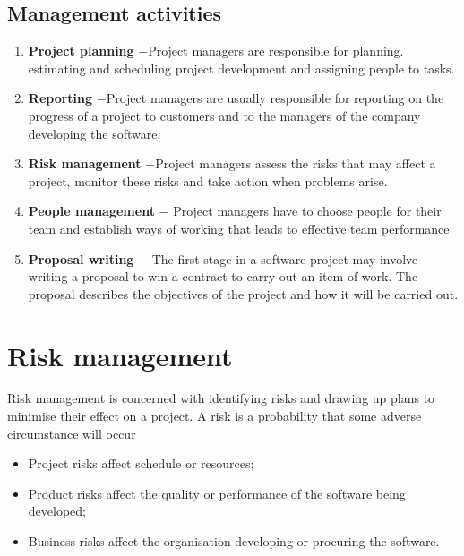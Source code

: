 \subsection{ Management activities}
\begin{enumerate}
\item \textbf{Project planning}
\newline $-$Project managers are responsible for planning. estimating and scheduling project development and assigning people to tasks.
\item \textbf{Reporting}
\newline $-$Project managers are usually responsible for reporting on the progress of a project to customers and to the managers of the company developing the software.
\item \textbf{Risk management}
\newline $-$Project managers assess the risks that may affect a project, monitor these risks and take action when problems arise.
\item \textbf{People management}
\newline $-$ Project managers have to choose people for their team and establish ways of working that leads to effective team performance
\item \textbf{Proposal writing}
\newline $-$ The first stage in a software project may involve writing a proposal to win a contract to carry out an item of work. The proposal describes the objectives of the project and how it will be carried out.
\end{enumerate}

\section{ Risk management}
Risk management is concerned with identifying risks and drawing up plans to minimise their effect on a project.
A risk is a probability that some adverse circumstance will occur

\begin{itemize}
  \item Project risks affect schedule or resources;
  \item Product risks affect the quality or performance of the software being developed;
  \item Business risks affect the organisation developing or procuring the software.

\end{itemize}

